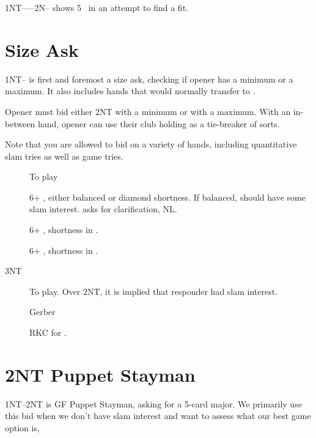 \documentclass[tom-ari]{subfiles}
\begin{document}
1NT------2N-- shows 5 \heartsuit ~in an attempt to find a fit.

\section[2S Size Ask]{ Size Ask} %

1NT-- is first and foremost a size ask, checking if opener has a minimum or a maximum. It also includes hands that would normally transfer to \clubsuit.

Opener must bid either 2NT with a minimum or  with a maximum. With an in-between hand, opener can use their club holding as a tie-breaker of sorts.

Note that you are allowed to bid  on a variety of hands, including quantitative slam tries as well as game tries.

\begin{description}
  \item[] To play 
  \item[] 6+ \clubsuit, either balanced or diamond shortness. If balanced, should have some slam interest.  asks for clarification, NL.
  \item[] 6+ \clubsuit, shortness in \heartsuit.
  \item[] 6+ \clubsuit, shortness in \spadesuit.
  \item[3NT] To play. Over 2NT, it is implied that responder had slam interest.
  \item[] Gerber 
  \item[] RKC for \clubsuit.
\end{description}

\section{2NT Puppet Stayman}

1NT--2NT is GF Puppet Stayman, asking for a 5-card major. We primarily use this bid when we don't have slam interest and want to assess what our best game option is,
\end{document}
